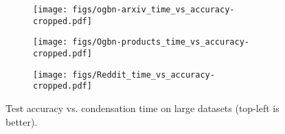 \begin{figure*}[htbp]
  \centering
  \begin{subfigure}[b]{0.85\linewidth}
    \centering
    \texttt{[image: figs/ogbn-arxiv\_time\_vs\_accuracy-cropped.pdf]}
    \label{fig:flickr}
  \end{subfigure}
  \begin{subfigure}[b]{0.85\linewidth}
    \centering
    \texttt{[image: figs/Ogbn-products\_time\_vs\_accuracy-cropped.pdf]}
    \label{fig:ogbnproducts}
  \end{subfigure}
  \begin{subfigure}[b]{0.85\linewidth}
    \centering
    \texttt{[image: figs/Reddit\_time\_vs\_accuracy-cropped.pdf]}
    \label{fig:redproducts}
  \end{subfigure}
  \caption{Test accuracy vs. condensation time on large datasets (top-left is better).}
  \label{fig:accuracy_vs_time_large_vertical}
\end{figure*}


